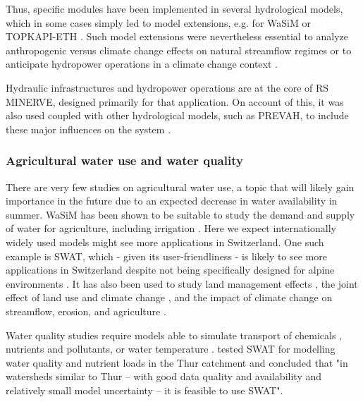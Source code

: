 \documentclass[10pt,a4paper]{article}
\begin{document}
Thus, specific modules have been implemented in several hydrological models, which in some cases simply led to model extensions, e.g. for WaSiM \citep{Verbunt2005} or TOPKAPI-ETH \citep{Fatichi2014}. Such model extensions were nevertheless essential  
to analyze anthropogenic versus climate change effects on natural streamflow regimes \citep{Fatichi2014} or to anticipate hydropower operations in a climate change context \citep{Fatichi2015b, Anghileri2018}. 


Hydraulic infrastructures and hydropower operations are at the core of RS MINERVE, designed primarily for that application. On account of this, it was also used coupled with other hydrological models, such as PREVAH, to include these major influences on the system \citep{Andres2016, Stucki2018}.
 
\subsubsection{Agricultural water use and water quality}
\label{sec:context:agriculture}

There are very few studies on agricultural water use, a topic that will likely gain importance in the future due to an expected decrease in water availability in summer. WaSiM has been shown to be suitable to study the demand and supply of water for agriculture, including irrigation \citep{Fuhrer2012}. Here we expect internationally widely used models might see more applications in Switzerland. One such example is SWAT, which - given its user-friendliness \citep{Abbaspour2007} - is likely to see more applications in Switzerland despite not being specifically designed for alpine environments \citep{Rahman2014, Andrianaki2019}. It has also been used to study land management effects \citep{Zarrineh2018}, the joint effect of land use and climate change \citep{Rahman2015}, and the impact of climate change on streamflow, erosion, and agriculture \citep{Zarrineh2020}.

Water quality studies require models able to simulate transport of chemicals \citep{queloz2015}, nutrients \citep{Abbaspour2007} and pollutants, or water temperature \citep{Michel2020}. \citet{Abbaspour2007} tested SWAT for modelling water quality and nutrient loads in the Thur catchment and concluded that "in watersheds similar to Thur – with good data quality and availability and relatively small model uncertainty – it is feasible to use SWAT". 
\end{document}
